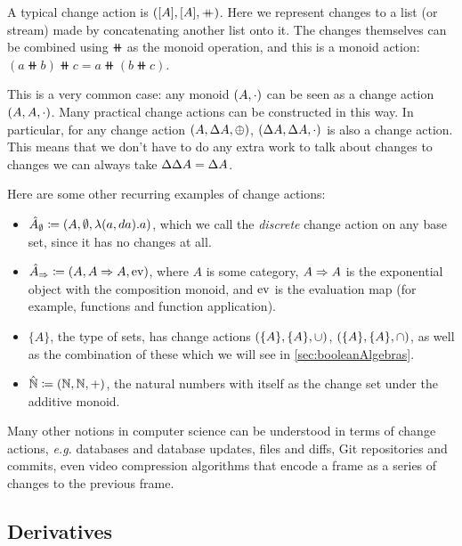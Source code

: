 A typical change action is $([A],[A],\mathbin{+\mkern-10mu+})$. Here we represent changes
to a list (or stream) made by concatenating another list onto it. The changes
themselves can be combined using $\doubleplus$ as the monoid operation, and this
is a monoid action: $(a \doubleplus b) \doubleplus c = a \doubleplus \left( b \doubleplus c \right)$.

This is a very common case: any monoid $(A, \cdot)$ can be seen as a change action
$(A,A,\cdot)$. Many practical change actions
can be constructed in this way. In particular, for any change action $(A,\Delta A,\oplus)$,
$(\Delta A,\Delta A,\cdot)$ is also a change action. This means
that we don't have to do any extra work to talk about changes to changes \textemdash{} we can always take $\Delta \Delta A = \Delta A$.

Here are some other recurring examples of change actions:
\begin{itemize}
  \item $\hat{A}_\emptyset \coloneqq (A,\emptyset,\lambda(a, da). a)$,
    which we call the \emph{discrete} change action on any base set, since it
    has no changes at all.
  \item $\hat{A}_\Rightarrow \coloneqq (A,{A} \Rightarrow {A},\operatorname{ev})$, where $A$ is some
    category, ${A} \Rightarrow {A}$ is the exponential object with the
    composition monoid, and $\operatorname{ev}$ is the evaluation map
    (for example, functions and function application).
  \item $\{A\}$, the type of sets, has change actions
    $(\{A\},\{A\},\cup)$, $(\{A\},\{A\},\cap)$, as well as
    the combination of these which we will see in \cref{sec:booleanAlgebras}.
  \item $\hat{\mathbb{N}} \coloneqq (\mathbb{N},\mathbb{N},+)$, the natural numbers with
    itself as the change set under the additive monoid.
\end{itemize}

Many other notions in computer science can be understood in terms of change actions, \emph{e.g.} databases
and database updates, files and diffs, Git repositories and commits, even video compression
algorithms that encode a frame as a series of changes to the previous frame.

\subsection{Derivatives}

